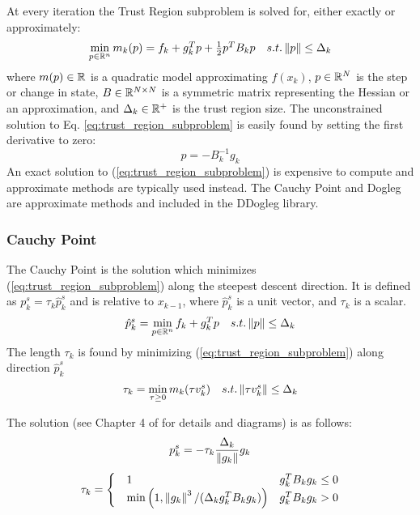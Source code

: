 At every iteration the Trust Region subproblem is solved for, either exactly or approximately:
\begin{equation}
\begin{array}{lr}
\min\limits_{p\in \mathbb{R}^n} m_k(p) = f_k + g^T_k p + \frac{1}{2}p^T B_k p & s.t. \left\lVert p\right\rVert \le \Delta_k
\end{array}
\label{eq:trust_region_subproblem}
\end{equation}
where $m(p) \in \mathbb{R}$ is a quadratic model approximating $f(x_k)$, $p \in \mathbb{R}^N$ is the step or change in state, $B \in \mathbb{R}^{N \times N}$ is a symmetric matrix representing the Hessian or an approximation, and $\Delta_k \in \mathbb{R}^+$ is the trust region size. The unconstrained solution to Eq. \ref{eq:trust_region_subproblem} is easily found by setting the first derivative to zero:
\begin{equation}
p = -B^{-1}_k g_k
\label{eq:TR_unconstrained_solution}
\end{equation}
An exact solution to (\ref{eq:trust_region_subproblem}) is expensive to compute and approximate methods are typically used instead. The Cauchy Point and Dogleg are approximate methods and included in the DDogleg library.

\subsubsection{Cauchy Point}
\label{section:cauchy}

The Cauchy Point is the solution which minimizes (\ref{eq:trust_region_subproblem}) along the steepest descent direction. It is defined as $p^s_k = \tau_k \hat{p}^s_k$ and is relative to $x_{k-1}$, where $\hat{p}^s_k$ is a unit vector, and $\tau_k$ is a scalar.
\begin{equation}
\begin{array}{lr}
\hat{p}^s_k = \min\limits_{p\in \mathbb{R}^n} f_k + g_k^T p & s.t. \left\lVert p\right\rVert \le \Delta_k
\end{array}
\end{equation}
The length $\tau_k$ is found by minimizing (\ref{eq:trust_region_subproblem}) along direction $\hat{p}^s_k$
\begin{equation}
\begin{array}{lr}
\tau_k = \min\limits_{\tau \ge 0} m_k(\tau v^s_k) & s.t. \left\lVert\tau v^s_k\right\rVert \le \Delta_k
\end{array}
\end{equation}

The solution (see Chapter 4 of \cite{numopt2006} for details and diagrams) is as follows:
\begin{equation}
p^s_k = -\tau_k \frac{\Delta_k}{\left\lVert g_k\right\rVert}g_k
\label{eq:cauchy_p}
\end{equation}
\begin{equation}
\tau_k =
	\begin{cases}
		\quad 1 & g_k^T B_k g_k \le 0 \\
		\quad \min\left(1,\left\lVert g_k\right\rVert^3/(\Delta_k g_k^T B_k g_k)\right) & g_k^T B_k g_k > 0
	\end{cases}
	\label{eq:cauchy_tau}
\end{equation}

